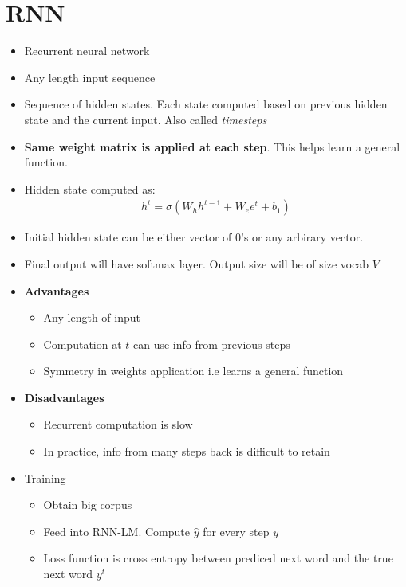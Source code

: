 \documentclass[a4paper]{article}
\begin{document}
\section{RNN}
\begin{itemize}
    \item Recurrent neural network
    \item Any length input sequence
    \item Sequence of hidden states. Each state computed based on previous hidden state and the current input. Also called \textit{timesteps} 
    \item \textbf{Same weight matrix is applied at each step}. This helps learn a general function.  
    \item Hidden state computed as:
    \begin{equation}
    \begin{split}
        h^t = \sigma(W_hh^{t-1} + W_ee^t + b_1)
    \end{split}
    \end{equation}
    \item Initial hidden state can be either vector of 0's or any arbirary vector.
    \item Final output will have softmax layer. Output size will be of size vocab $V$
    \item \textbf{Advantages}
    \begin{itemize}
        \item Any length of input
        \item Computation at $t$ can use info from previous steps
        \item Symmetry in weights application i.e learns a general function
    \end{itemize}
    \item \textbf{Disadvantages} 
    \begin{itemize}
        \item Recurrent computation is slow
        \item In practice, info from many steps back is difficult to retain
    \end{itemize}
    \item Training
        \begin{itemize}
            \item Obtain big corpus
            \item  Feed into RNN-LM. Compute $\hat{y}$ for every step $y$ 
            \item Loss function is cross entropy between prediced next word and the true next word $y^t$

\end{itemize}
\end{itemize}
\end{document}
